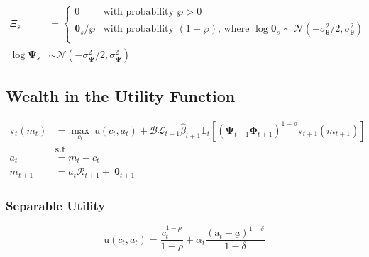 \documentclass{article}
\newcommand{\DiscFac}{\beta}
\newcommand{\uFunc}{\mathrm{u}}
\newcommand{\Alive}{\mathcal{L}}
\newcommand{\Ex}{\mathbb{E}}
\newcommand{\beth}{\mathcal{B}}
\newcommand{\CRRA}{\rho}
\newcommand{\PermGroFac}{\pmb{\Phi}}
\newcommand{\vFunc}{\mathrm{v}}
\newcommand{\PermShk}{\mathbf{\Psi}}
\newcommand{\aNrm}{a}
\newcommand{\cNrm}{c}
\newcommand{\RNrm}{\mathcal{R}}
\newcommand{\TranShkEmp}{\pmb{\theta}}
\newcommand{\pZero}{\wp}
\newcommand{\thicksim}{\sim}
\newcommand{\aFunc}{\mathrm{a}}
\newcommand{\kapShare}{\alpha}
\newcommand{\wealthShare}{\delta}
\begin{document}
\begin{equation}
\begin{align}
  \Xi_{s}           & =
  \begin{cases}
      0\phantom{/\pZero}     & \text{with probability $\pZero>0$}                                                                                                            \\
      \TranShkEmp_{s}/\pZero & \text{with probability $(1-\pZero)$, where $\log \TranShkEmp_{s}\thicksim \mathcal{N}(-\sigma_{\TranShkEmp}^{2}/2,\sigma_{\TranShkEmp}^{2})$} \\
  \end{cases} \\
  \log \PermShk_{s} & \thicksim \mathcal{N}(-\sigma_{\PermShk}^{2}/2,\sigma_{\PermShk}^{2})
\end{align}
\end{equation}

\subsection{Wealth in the Utility Function}\label{Wealth in the Utility Function}

\begin{equation}
\begin{align}
  {\vFunc}_{t}({m}_{t}) & = \max_{\cNrm_{t}} ~  \uFunc(\cNrm_{t}, \aNrm_{t})+\beth\Alive_{t+1}\hat{\DiscFac}_{t+1}
  \Ex_{t}[(\PermShk_{t+1}\PermGroFac_{t+1})^{1-\CRRA}{\vFunc}_{t+1}({m}_{t+1})]                                 \\
                        & \text{s.t.}                                                               & \nonumber \\
  \aNrm_{t}               & = {m}_{t}-\cNrm_{t} \nonumber
  \\  {m}_{t+1}  & = \aNrm_{t}\RNrm_{t+1}+ ~\TranShkEmp_{t+1}
\end{align}
\end{equation}

\subsubsection{Separable Utility}\label{Separable Utility}

\begin{equation}
\uFunc(\cNrm_{t}, \aNrm_{t}) = \frac{\cNrm_{t}^{1-\CRRA}}{1-\CRRA} + \kapShare_{t} \frac{(\aFunc_{t} - \underline\aNrm)^{1-\wealthShare}}{1-\wealthShare}
\end{equation}
\end{document}
